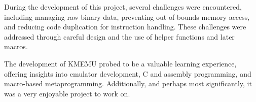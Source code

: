 \documentclass[10pt,a4paper,final]{article}
\begin{document}
During the development of this project, several challenges were encountered,
including managing raw binary data, preventing out-of-bounds memory access, and
reducing code duplication for instruction handling. These challenges were
addressed through careful design and the use of helper functions and later
macros.

The development of KMEMU probed to be a valuable learning experience, offering
insights into emulator development, C and assembly programming, and macro-based
metaprogramming. Additionally, and perhaps most significantly, it was a very
enjoyable project to work on.
\end{document}
